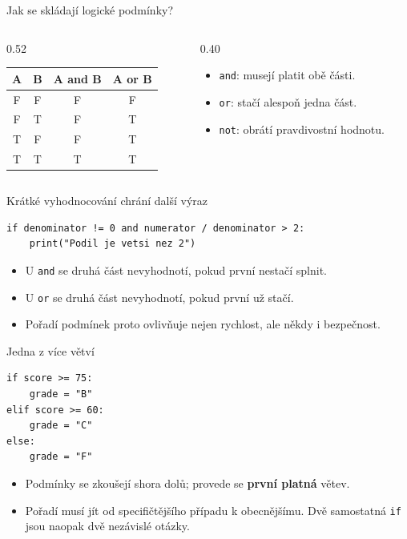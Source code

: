\documentclass[aspectratio=169,t]{beamer}
\begin{document}
\begin{frame}{Jak se skládají logické podmínky?}
  \vspace{4mm}
  \begin{columns}[T]
    \begin{column}{0.52\textwidth}
      \centering
      \small
      \begin{tabular}{c c c c}
        \textbf{A} & \textbf{B} & \textbf{A and B} & \textbf{A or B} \\
        \hline
        F & F & F & F \\
        F & T & F & T \\
        T & F & F & T \\
        T & T & T & T
      \end{tabular}
    \end{column}
    \begin{column}{0.40\textwidth}
      \begin{itemize}
        \item \texttt{and}: musejí platit obě části.
        \item \texttt{or}: stačí alespoň jedna část.
        \item \texttt{not}: obrátí pravdivostní hodnotu.
      \end{itemize}
    \end{column}
  \end{columns}
\end{frame}

\begin{frame}[fragile]{Krátké vyhodnocování chrání další výraz}
\begin{lstlisting}[style=python]
if denominator != 0 and numerator / denominator > 2:
    print("Podil je vetsi nez 2")
\end{lstlisting}
  \begin{itemize}
    \item U \texttt{and} se druhá část nevyhodnotí, pokud první nestačí splnit.
    \item U \texttt{or} se druhá část nevyhodnotí, pokud první už stačí.
    \item Pořadí podmínek proto ovlivňuje nejen rychlost, ale někdy i bezpečnost.
  \end{itemize}
\end{frame}

\begin{frame}[fragile]{Jedna z více větví}
\begin{lstlisting}[style=python]
if score >= 75:
    grade = "B"
elif score >= 60:
    grade = "C"
else:
    grade = "F"
\end{lstlisting}
  \begin{itemize}
    \item Podmínky se zkoušejí shora dolů; provede se \textbf{první platná} větev.
    \item Pořadí musí jít od specifičtějšího případu k obecnějšímu.
      Dvě samostatná \texttt{if} jsou naopak dvě nezávislé otázky.
  \end{itemize}
\end{frame}
\end{document}
